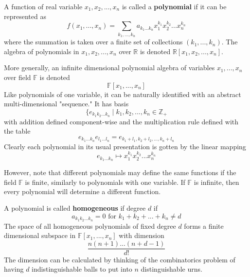 \documentclass{article}
\begin{document}
      \begin{definition}
        A function of real variable $x_1, x_2, ..., x_n$ is called a \textbf{polynomial} if it can be represented as 
        \begin{equation}
          f(x_1, ..., x_n) =  \sum_{k_1, ..., k_n} a_{k_1 ... k_n} x_1^{k_1} x_2^{k_2} ... x_n^{k_n}
        \end{equation}
        where the summation is taken over a finite set of collections $(k_1, ..., k_n)$. The algebra of polynomials in $x_1, x_2, ..., x_n$ over $\mathbb{R}$ is denoted $\mathbb{R}[x_1, x_2, ..., x_n]$. 
      \end{definition}

      \begin{definition}
        More generally, an infinite dimensional polynomial algebra of variables $x_1, ..., x_n$ over field $\mathbb{F}$ is denoted
        \begin{equation}
          \mathbb{F}[x_1, ..., x_n]
        \end{equation}
        Like polynomials of one variable, it can be naturally identified with an abstract multi-dimensional "sequence." It has basis 
        \begin{equation}
          \{e_{k_1 k_2 ... k_n} \;|\; k_1, k_2, ..., k_n \in \mathbb{Z}_+
        \end{equation}
        with addition defined component-wise and the multiplication rule defined with the table
        \begin{equation}
          e_{k_1...k_n} e_{l_1 ... l_n} = e_{k_1 + l_1, k_2 + l_2, ..., k_n + l_n}
        \end{equation}
        Clearly each polynomial in its usual presentation is gotten by the linear mapping
        \begin{equation}
          e_{k_1 ... k_n} \mapsto x_1^{k_1} x_2^{k_2} ... x_n^{k_n}
        \end{equation}
      \end{definition}

      However, note that different polynomials may define the same functions if the field $\mathbb{F}$ is finite, similarly to polynomials with one variable. If $\mathbb{F}$ is infinite, then every polynomial will determine a different function. 

      \begin{definition}
        A polynomial is called \textbf{homogeneous} if degree $d$ if 
        \begin{equation}
          a_{k_1 k_2 ... k_n} = 0 \text{ for } k_1 + k_2 + ... + k_n \neq d
        \end{equation}
        The space of all homogeneous polynomials of fixed degree $d$ forms a finite dimensional subspace in $\mathbb{F}[x_1, ..., x_n]$ with dimension 
        \begin{equation}
          \frac{n(n+1)...(n+d-1)}{d!}
        \end{equation}
        The dimension can be calculated by thinking of the combinatorics problem of having $d$ indistinguishable balls to put into $n$ distinguishable urns. 
      \end{definition}
\end{document}
